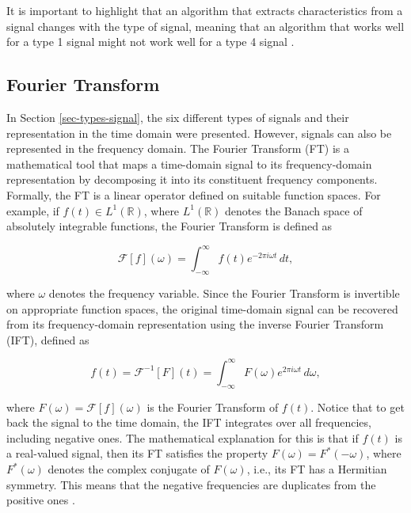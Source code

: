 It is important to highlight that an algorithm that extracts characteristics from a signal changes with the type of signal, meaning that an algorithm that works well for a type 1 signal might not work well for a type 4 signal \cite{Boashash2016ChapterITimeFrequency}.

\subsection{Fourier Transform}\label{sec-FT}

In Section \ref{sec-types-signal}, the six different types of signals and their representation in the time domain were presented. However, signals can also be represented in the frequency domain. The Fourier Transform (FT) is a mathematical tool that maps a time-domain signal to its frequency-domain representation by decomposing it into its constituent frequency components. Formally, the FT is a linear operator defined on suitable function spaces. For example, if $f(t) \in L^1(\mathbb{R})$, where $L^1(\mathbb{R})$ denotes the Banach space of absolutely integrable functions, the Fourier Transform is defined as \cite{grochenig2001foundations}

\begin{equation}
    \mathcal{F}[f](\omega) = \int_{-\infty}^{\infty} f(t)e^{-2\pi i\omega t}\,dt,
    \label{eq:FT}
\end{equation}

\noindent where $\omega$ denotes the frequency variable. Since the Fourier Transform is invertible on appropriate function spaces, the original time-domain signal can be recovered from its frequency-domain representation using the inverse Fourier Transform (IFT), defined as

\begin{equation}
    f(t) = \mathcal{F}^{-1}[F](t) =
    \int_{-\infty}^{\infty} F(\omega)e^{2\pi i\omega t}\,d\omega,
    \label{eq:IFT}
\end{equation}

\noindent where $F(\omega)=\mathcal{F}[f](\omega)$ is the Fourier Transform of $f(t)$. Notice that to get back the signal to the time domain, the IFT integrates over all frequencies, including negative ones. The mathematical explanation for this is that if $f(t)$ is a real-valued signal, then its FT satisfies the property $F(\omega) = {F^*(-\omega)}$, where ${F^*(\omega)}$ denotes the complex conjugate of $F(\omega)$, i.e., its FT has a Hermitian symmetry. This means that the negative frequencies are duplicates from the positive ones \cite{Boashash2016ChapterITimeFrequency}.

